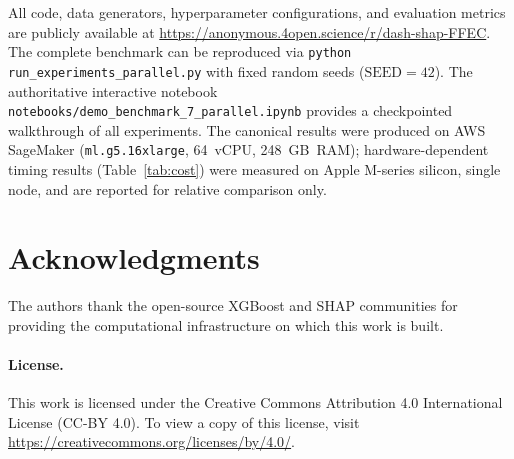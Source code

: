 \documentclass[10pt]{article}
\begin{document}
All code, data generators, hyperparameter configurations, and evaluation
metrics are publicly available at
\url{https://anonymous.4open.science/r/dash-shap-FFEC}. The complete benchmark
can be reproduced via \texttt{python run\_experiments\_parallel.py} with fixed
random seeds ($\text{SEED} = 42$). The authoritative interactive
notebook \texttt{notebooks/demo\_benchmark\_7\_parallel.ipynb} provides a
checkpointed walkthrough of all experiments. The canonical results were
produced on AWS SageMaker (\texttt{ml.g5.16xlarge}, 64~vCPU, 248~GB~RAM);
hardware-dependent timing results (Table~\ref{tab:cost}) were measured on
Apple M-series silicon, single node, and are reported for relative comparison only.

\section*{Acknowledgments}

The authors thank the open-source XGBoost and SHAP communities for
providing the computational infrastructure on which this work is built.

\paragraph{License.}
This work is licensed under the Creative Commons Attribution 4.0
International License (CC-BY 4.0). To view a copy of this license, visit
\url{https://creativecommons.org/licenses/by/4.0/}.



\end{document}
